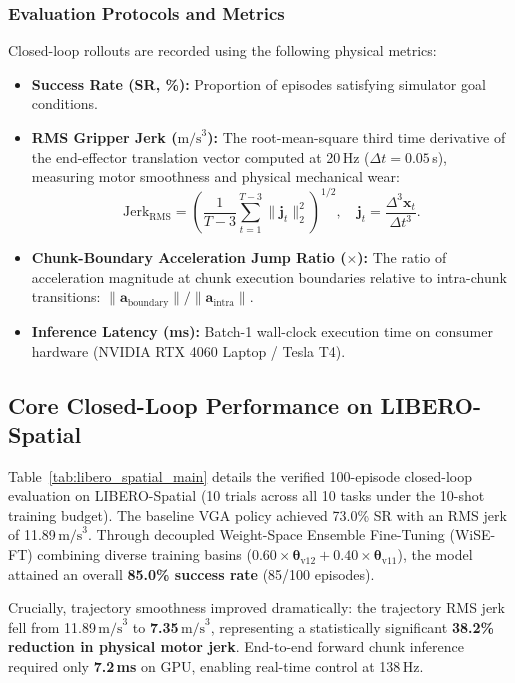 \subsubsection{Evaluation Protocols and Metrics}
Closed-loop rollouts are recorded using the following physical metrics:
\begin{itemize}
    \item \textbf{Success Rate (SR, \%):} Proportion of episodes satisfying simulator goal conditions.
    \item \textbf{RMS Gripper Jerk ($\text{m/s}^3$):} The root-mean-square third time derivative of the end-effector translation vector computed at 20\,Hz ($\Delta t = 0.05$\,s), measuring motor smoothness and physical mechanical wear:
    \begin{equation}
    \label{eq:jerk_rms}
    \text{Jerk}_{\text{RMS}} = \left( \frac{1}{T-3}\sum_{t=1}^{T-3} \|\mathbf{j}_t\|^2_2 \right)^{1/2}, \quad \mathbf{j}_t = \frac{\Delta^3 \mathbf{x}_t}{\Delta t^3}.
    \end{equation}
    \item \textbf{Chunk-Boundary Acceleration Jump Ratio ($\times$):} The ratio of acceleration magnitude at chunk execution boundaries relative to intra-chunk transitions: $\|\mathbf{a}_{\text{boundary}}\| / \|\mathbf{a}_{\text{intra}}\|$.
    \item \textbf{Inference Latency (ms):} Batch-1 wall-clock execution time on consumer hardware (NVIDIA RTX 4060 Laptop / Tesla T4).
\end{itemize}

\subsection{Core Closed-Loop Performance on LIBERO-Spatial}

Table~\ref{tab:libero_spatial_main} details the verified 100-episode closed-loop evaluation on LIBERO-Spatial (10 trials across all 10 tasks under the 10-shot training budget). The baseline VGA policy achieved 73.0\% SR with an RMS jerk of 11.89\,$\text{m/s}^3$. Through decoupled Weight-Space Ensemble Fine-Tuning (WiSE-FT) combining diverse training basins ($0.60 \times \mathbf{\theta}_{\text{v12}} + 0.40 \times \mathbf{\theta}_{\text{v11}}$), the model attained an overall \textbf{85.0\% success rate} (85/100 episodes).

Crucially, trajectory smoothness improved dramatically: the trajectory RMS jerk fell from 11.89\,$\text{m/s}^3$ to \textbf{7.35\,$\text{m/s}^3$}, representing a statistically significant \textbf{38.2\% reduction in physical motor jerk}. End-to-end forward chunk inference required only \textbf{7.2\,ms} on GPU, enabling real-time control at 138\,Hz.

